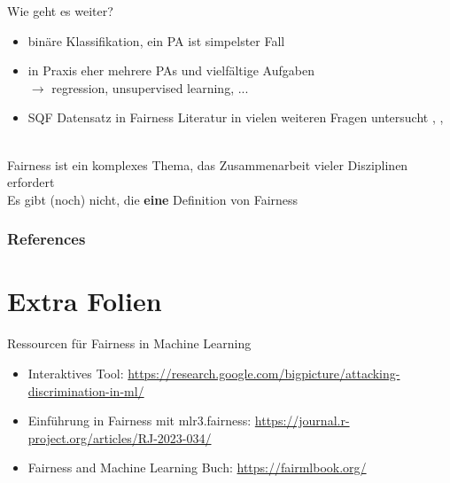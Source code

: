\documentclass[aspectratio=169]{beamer}
\begin{document}
\begin{frame}{Wie geht es weiter?}
	\begin{itemize}
		\item binäre Klassifikation, ein PA ist simpelster Fall
		\item in Praxis eher mehrere PAs und vielfältige Aufgaben\\ $\rightarrow$ regression, unsupervised learning, ...
		\item SQF Datensatz in Fairness Literatur in vielen weiteren Fragen untersucht \cite{RambachanBBOEFW}, \cite{Kallus2018RUFMLPDa}, \cite{goel2016}
	\end{itemize}
	\vspace*{1cm}
	 \\ Fairness ist ein komplexes Thema, das Zusammenarbeit vieler Disziplinen erfordert \\ Es gibt (noch) nicht, die \textbf{eine} Definition von Fairness
\end{frame}

\begin{frame}[allowframebreaks]
	\frametitle{References}
	
	
\end{frame}

\section{Extra Folien}

\begin{frame}{Ressourcen für Fairness in Machine Learning}
    \begin{itemize}
        \item Interaktives Tool: \url{https://research.google.com/bigpicture/attacking-discrimination-in-ml/}
        \item Einführung in Fairness mit mlr3.fairness: \url{https://journal.r-project.org/articles/RJ-2023-034/}
        \item Fairness and Machine Learning Buch: \url{https://fairmlbook.org/}
    \end{itemize}
\end{frame}
\end{document}
